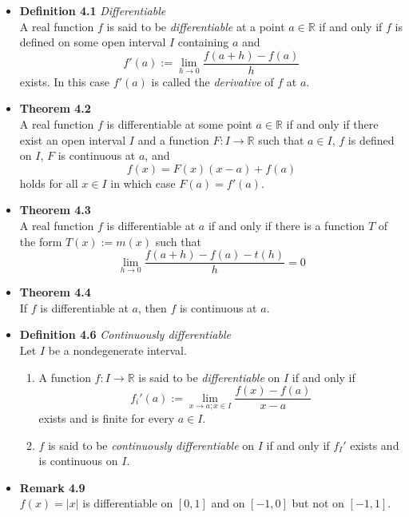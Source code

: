 \documentclass[11pt,a4paper]{article}
\begin{document}
\begin{itemize}

    \item \textbf{Definition 4.1} \emph{Differentiable} \\
        A real function $f$ is said to be \emph{differentiable} at a point $a \in \mathbb{R}$
        if and only if $f$ is defined on some open interval $I$ containing $a$ and
        \[
            f'(a) := \lim_{h \to 0} \frac{f(a+h) - f(a)}{h}
        \]
        exists.
        In this case $f'(a)$ is called the \emph{derivative} of $f$ at $a$.

    \item \textbf{Theorem 4.2} \\
        A real function $f$ is differentiable at some point $a \in \mathbb{R}$ if and only if
        there exist an open interval $I$ and a function $F : I \to \mathbb{R}$ such that
        $a \in I$, $f$ is defined on $I$, $F$ is continuous at $a$, and
        \[
            f(x) = F(x) (x-a) + f(a)
        \]
        holds for all $x \in I$ in which case $F(a) = f'(a)$.

    \item \textbf{Theorem 4.3} \\
        A real function $f$ is differentiable at $a$ if and only if there is a function
        $T$ of the form $T(x) := m(x)$ such that
        \[
            \lim_{h \to 0} \frac{f(a+h) - f(a) - t(h)}{h} = 0
        \]

    \item \textbf{Theorem 4.4} \\
        If $f$ is differentiable at $a$, then $f$ is continuous at $a$.

    \item \textbf{Definition 4.6} \emph{Continuously differentiable} \\
        Let $I$ be a nondegenerate interval.
        \begin{enumerate}
            \item A function $f : I \to \mathbb{R}$ is said to be \emph{differentiable}
                on $I$ if and only if
                \[
                    f_i'(a) := \lim_{x \to a; x \in I} \frac{f(x) - f(a)}{x-a}
                \]
                exists and is finite for every $a \in I$.
            \item $f$ is said to be \emph{continuously differentiable} on $I$ if and only if
                $f_I'$ exists and is continuous on $I$.
        \end{enumerate}

    \item \textbf{Remark 4.9} \\
        $f(x) = |x|$ is differentiable on $[0, 1]$ and on $[-1, 0]$ but not on $[-1, 1]$.

\end{itemize}
\end{document}
